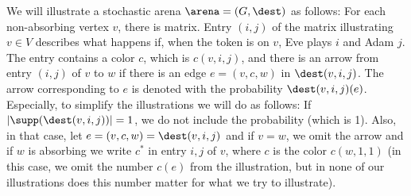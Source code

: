We will illustrate a stochastic arena $\arena=(G,\dest)$ as follows:
For each non-absorbing vertex $v$, there is matrix.
 Entry $(i,j)$ of the matrix illustrating $v\in V$ describes what happens if, when the token is on $v$, Eve plays $i$ and Adam $j$. The entry contains a color $c$, which is $c(v,i,j)$, and 
there is an arrow from entry $(i,j)$ of $v$ to $w$ if there is an edge   
$e=(v,c,w)$ in $\dest(v,i,j)$. 
 The arrow corresponding to $e$ is denoted with the probability $\dest(v,i,j)(e)$. 
Especially, to simplify the illustrations we will do as follows: If $|\supp(\dest(v,i,j))|=1$, we do not include the probability (which is 1). Also, in that case, let $e=(v,c,w)=\dest(v,i,j)$ 
and 
if $v=w$, we omit the arrow and if $w$ is absorbing we write $c^*$ in entry $i,j$ of $v$, where $c$ is the color $c(w,1,1)$ (in this case, we omit the number $c(e)$ from the illustration, but in none of our illustrations does this number matter for what we try to illustrate). 
